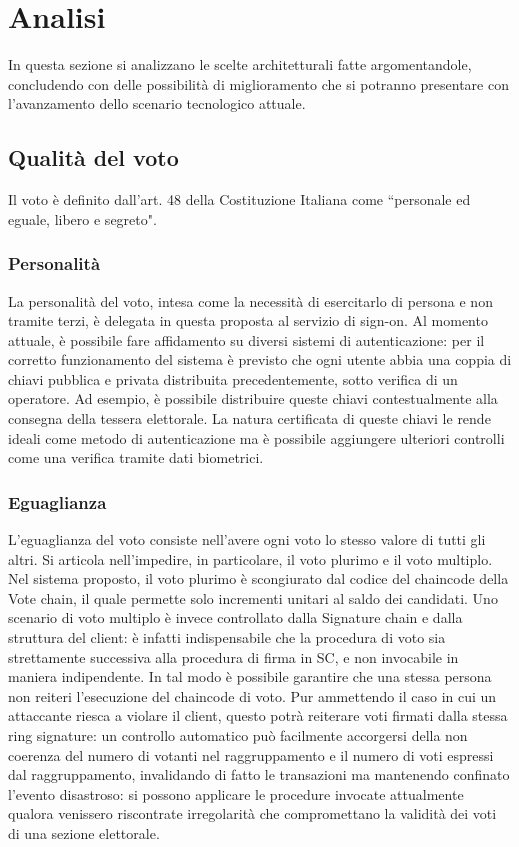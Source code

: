 \section{Analisi}
	In questa sezione si analizzano le scelte architetturali fatte argomentandole, concludendo con delle possibilità di miglioramento che si potranno presentare con l'avanzamento dello scenario tecnologico attuale.
	
	\subsection{Qualità del voto}
		Il voto è definito dall'art. 48 \cite{art48} della Costituzione Italiana come ``personale ed eguale, libero e segreto".
		\subsubsection{Personalità}\label{subsec:personalita_voto}
			La personalità del voto, intesa come la necessità di esercitarlo di persona e non tramite terzi, è delegata in questa proposta al servizio di sign-on. Al momento attuale, è possibile fare affidamento su diversi sistemi di autenticazione: per il corretto funzionamento del sistema è previsto che ogni utente abbia una coppia di chiavi pubblica e privata distribuita precedentemente, sotto verifica di un operatore. Ad esempio, è possibile distribuire queste chiavi contestualmente alla consegna della tessera elettorale. La natura certificata di queste chiavi le rende ideali come metodo di autenticazione ma è possibile aggiungere ulteriori controlli come una verifica tramite dati biometrici.
		
		\subsubsection{Eguaglianza}
			L'eguaglianza del voto consiste nell'avere ogni voto lo stesso valore di tutti gli altri. Si articola nell'impedire, in particolare, il voto plurimo e il voto multiplo. Nel sistema proposto, il voto plurimo è scongiurato dal codice del chaincode della Vote chain, il quale permette solo incrementi unitari al saldo dei candidati. Uno scenario di voto multiplo è invece controllato dalla Signature chain e dalla struttura del client: è infatti indispensabile che la procedura di voto sia strettamente successiva alla procedura di firma in SC, e non invocabile in maniera indipendente. In tal modo è possibile garantire che una stessa persona non reiteri l'esecuzione del chaincode di voto. Pur ammettendo il caso in cui un attaccante riesca a violare il client, questo potrà reiterare voti firmati dalla stessa ring signature: un controllo automatico può facilmente accorgersi della non coerenza del numero di votanti nel raggruppamento e il numero di voti espressi dal raggruppamento, invalidando di fatto le transazioni ma mantenendo confinato l'evento disastroso: si possono applicare le procedure invocate attualmente qualora venissero riscontrate irregolarità che compromettano la validità dei voti di una sezione elettorale.
		
